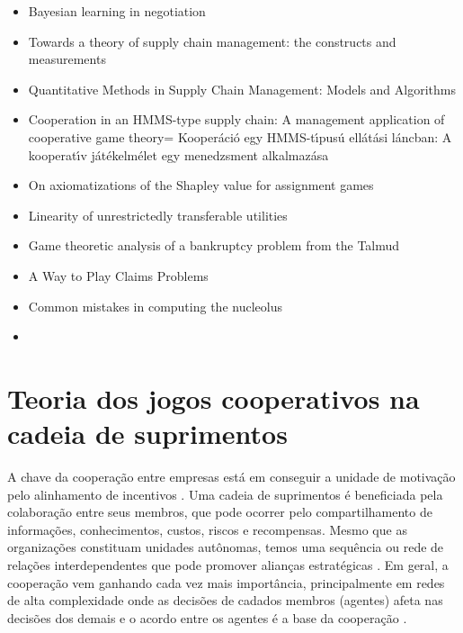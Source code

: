 \documentclass[
	article,			        %
	11pt,				          %
	oneside,			        %
	a4paper,			        %
	english,			        %
	brazil,				        %
	sumario=tradicional
]{abntex2}\usepackage[]{graphicx}\usepackage[]{color}
\begin{document}
\begin{itemize}
  \item Bayesian learning in negotiation \cite{Zeng.1998}
  \item Towards a theory of supply chain management: the constructs and measurements \cite{Chen.2004}
  \item Quantitative Methods in Supply Chain Management: Models and Algorithms \cite{Christou.2012}
  \item Cooperation in an HMMS-type supply chain: A management application of cooperative game theory= Kooper{\'a}ci{\'o} egy HMMS-t{\'\i}pus{\'u} ell{\'a}t{\'a}si l{\'a}ncban: A kooperat{\'\i}v j{\'a}t{\'e}kelm{\'e}let egy menedzsment alkalmaz{\'a}sa \cite{Dobos.2010b}
  \item On axiomatizations of the Shapley value for assignment games \cite{Brink.2015}
  \item Linearity of unrestrictedly transferable utilities \cite{Aumann.1960}
  \item Game theoretic analysis of a bankruptcy problem from the Talmud \cite{Aumann.1985}
  \item A Way to Play Claims Problems \cite{Gimenez.2014}
  \item Common mistakes in computing the nucleolus \cite{Guajardo.2015}
  \item 
\end{itemize}


\section{Teoria dos jogos cooperativos na cadeia de suprimentos}

A chave da cooperação entre empresas está em conseguir a unidade de motivação pelo alinhamento de incentivos \cite{Cao.2012}. Uma cadeia de suprimentos é beneficiada pela colaboração entre seus membros, que pode ocorrer pelo compartilhamento de informações, conhecimentos, custos, riscos e recompensas. Mesmo que as organizações constituam unidades autônomas, temos uma sequência ou rede de relações interdependentes que pode promover alianças estratégicas \cite{Chen.2004}. Em geral, a cooperação vem ganhando cada vez mais importância, principalmente em redes de alta complexidade \cite{Drechsel.2010} onde as decisões de cadados membros (agentes) afeta nas decisões dos demais e o acordo entre os agentes é a base da cooperação \cite{Young.1994}.
\end{document}
